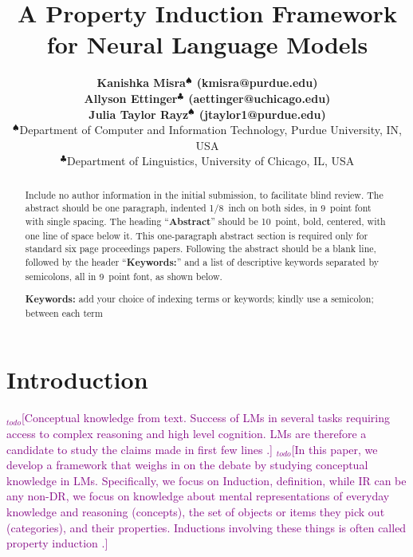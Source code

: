 \documentclass[10pt,letterpaper]{article}
\title{A Property Induction Framework for Neural Language Models}
\author{
{\large \bf Kanishka Misra$^{\spadesuit}$ (kmisra@purdue.edu)\\
\large \bf Allyson Ettinger$^{\clubsuit}$ (aettinger@uchicago.edu) \\
\large \bf Julia Taylor Rayz$^{\spadesuit}$ (jtaylor1@purdue.edu)} \\
  $^{\spadesuit}$Department of Computer and Information Technology,
  Purdue University, IN, USA \\
  $^{\clubsuit}$Department of Linguistics, University of Chicago, IL, USA
}
\newcommand{\todo}[1]{\textcolor{purple}{$_{todo}$[#1]}}
\begin{document}
\maketitle


\begin{abstract}
Include no author information in the initial submission, to facilitate
blind review.  The abstract should be one paragraph, indented 1/8~inch on both sides,
in 9~point font with single spacing. The heading ``{\bf Abstract}''
should be 10~point, bold, centered, with one line of space below
it. This one-paragraph abstract section is required only for standard
six page proceedings papers. Following the abstract should be a blank
line, followed by the header ``{\bf Keywords:}'' and a list of
descriptive keywords separated by semicolons, all in 9~point font, as
shown below.

\textbf{Keywords:} 
add your choice of indexing terms or keywords; kindly use a
semicolon; between each term
\end{abstract}


\section{Introduction}
\todo{Conceptual knowledge from text. Success of LMs in several tasks requiring access to complex reasoning and high level cognition. LMs are therefore a candidate to study the claims made in first few lines \citep{lupyan2019words}.}
\todo{In this paper, we develop a framework that weighs in on the debate by studying conceptual knowledge in LMs. Specifically, we focus on Induction, definition, while IR can be any non-DR, we focus on knowledge about mental representations of everyday knowledge and reasoning (concepts), the set of objects or items they pick out (categories), and their properties. Inductions involving these things is often called property induction \citep{}.}
\end{document}
